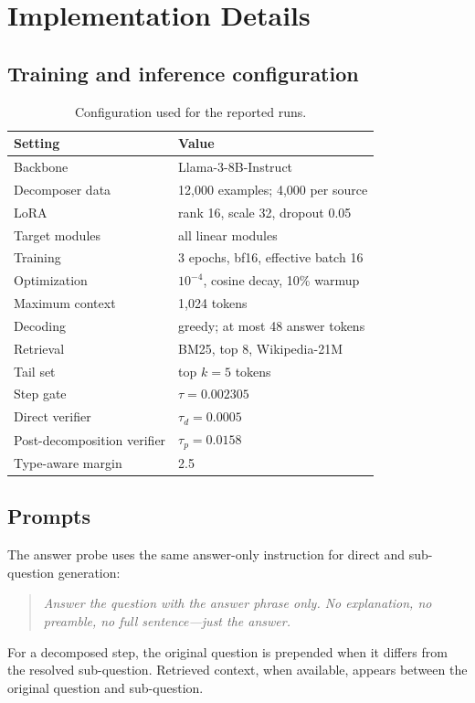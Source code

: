 \section{Implementation Details}
\label{app:details}

\subsection{Training and inference configuration}

\begin{table}[h]
\caption{Configuration used for the reported \method{} runs.}
\label{tab:implementation}
\centering
\small
\setlength{\tabcolsep}{6pt}
\begin{tabular}{ll}
\toprule
Setting & Value \\
\midrule
Backbone & Llama-3-8B-Instruct \\
Decomposer data & 12,000 examples; 4,000 per source \\
LoRA & rank 16, scale 32, dropout 0.05 \\
Target modules & all linear modules \\
Training & 3 epochs, bf16, effective batch 16 \\
Optimization & \(10^{-4}\), cosine decay, 10\% warmup \\
Maximum context & 1,024 tokens \\
Decoding & greedy; at most 48 answer tokens \\
Retrieval & BM25, top 8, Wikipedia-21M \\
Tail set & top \(k=5\) tokens \\
Step gate & \(\tau=0.002305\) \\
Direct verifier & \(\tau_d=0.0005\) \\
Post-decomposition verifier & \(\tau_p=0.0158\) \\
Type-aware margin & 2.5 \\
\bottomrule
\end{tabular}
\end{table}

\subsection{Prompts}

The answer probe uses the same answer-only instruction for direct and
sub-question generation:
\begin{quote}
\small
\emph{Answer the question with the answer phrase only. No explanation, no
preamble, no full sentence---just the answer.}
\end{quote}
For a decomposed step, the original question is prepended when it differs from
the resolved sub-question. Retrieved context, when available, appears between
the original question and sub-question.

